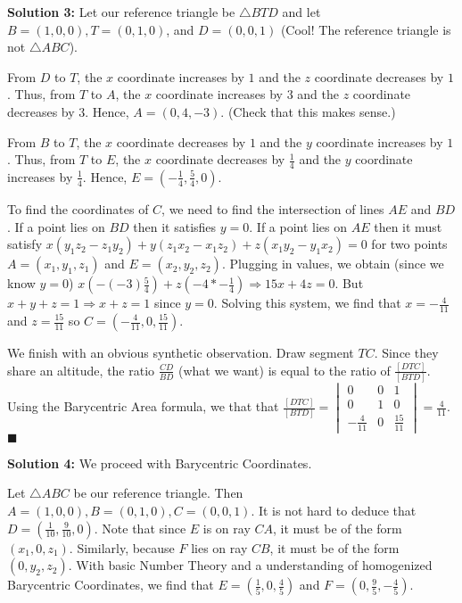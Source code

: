 \documentclass{article}
\begin{document}
\textbf{Solution 3:}
Let our reference triangle be $\triangle BTD$ and let $B = (1,0,0), T = (0,1,0)$, and $D = (0,0,1)$ (Cool! The reference triangle is not $\triangle ABC$). 

From $D$ to $T$, the $x$ coordinate increases by $1$ and the $z$ coordinate decreases by $1$. Thus, from $T$ to $A$, the $x$ coordinate increases by $3$ and the $z$ coordinate decreases by $3$. Hence, $A=(0,4,-3)$. (Check that this makes sense.) 

From $B$ to $T$, the $x$ coordinate decreases by $1$ and the $y$ coordinate increases by $1$. Thus, from $T$ to $E$, the $x$ coordinate decreases by $\frac 14$ and the $y$ coordinate increases by $\frac 14$. Hence, $E=(-\frac 14,\frac 54,0)$. 

To find the coordinates of $C$, we need to find the intersection of lines $AE$ and $BD$. If a point lies on $BD$ then it satisfies $y=0$. If a point lies on $AE$ then it must satisfy $x(y_1z_2 -z_1y_2)+y(z_1x_2-x_1z_2)+z(x_1y_2-y_1x_2)=0$ for two points $A=(x_1,y_1,z_1)$ and $E=(x_2,y_2,z_2)$. Plugging in values, we obtain (since we know $y=0$) $x(-(-3)\frac 54)+z(-4*-\frac 14) \Rightarrow 15x+4z=0$. But $x+y+z=1 \Rightarrow x+z=1$ since $y=0$. Solving this system, we find that $x=-\frac{4}{11}$ and $z=\frac{15}{11}$ so $C=(-\frac{4}{11},0,\frac{15}{11})$. 

We finish with an obvious synthetic observation. Draw segment $TC$. Since they share an altitude, the ratio $\frac{CD}{BD}$ (what we want) is equal to the ratio of $\frac{[DTC]}{[BTD]}$. Using the Barycentric Area formula, we that that $\frac{[DTC]}{[BTD]}=\begin{vmatrix}
0 &0 &1 \\
0 &1 &0 \\
-\frac {4}{11}& 0&\frac {15}{11}
\end{vmatrix}=\frac{4}{11}$. $\blacksquare$
\vspace{.2in}


\textbf{Solution 4:} 
We proceed with Barycentric Coordinates.

Let $\triangle ABC$ be our reference triangle. Then $A=(1,0,0), B=(0,1,0),C=(0,0,1)$. It is not hard to deduce that $D=(\frac{1}{10},\frac{9}{10},0)$. Note that since $E$ is on ray $CA$, it must be of the form $(x_1,0,z_1)$. Similarly, because $F$ lies on ray $CB$, it must be of the form $(0,y_2,z_2)$. With basic Number Theory and a understanding of homogenized Barycentric Coordinates, we find that $E=(\frac 15,0,\frac 45)$ and $F=(0,\frac 95,-\frac 45)$. 
\end{document}
